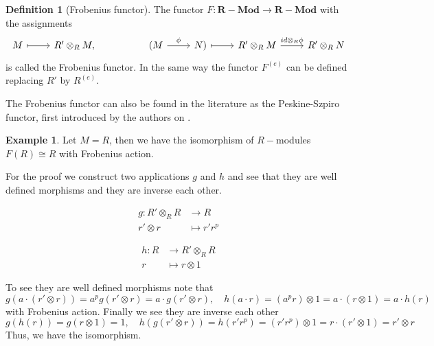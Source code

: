 \documentclass[leqno]{article}
\theoremstyle{definition}
\newtheorem{definition}{Definition}[section]
\newtheorem{example}{Example}[section]
\newcommand{\catname}[1]{{\mathbf{#1}}}
\newcommand{\Mod}{\catname{R-Mod}}
\begin{document}
\begin{definition}[Frobenius functor] The functor $F:\Mod \to \Mod$ with the assignments 
\[\begin{tikzcd}
	M & {R'\otimes_RM,} && {(M} & {N)} & {R'\otimes_R M} & {R'\otimes_RN}
	\arrow["\phi", from=1-4, to=1-5]
	\arrow["{id\otimes_R\phi}", from=1-6, to=1-7]
	\arrow[maps to, from=1-5, to=1-6]
	\arrow[maps to, from=1-1, to=1-2]
\end{tikzcd}\]
is called the Frobenius functor. In the same way the functor $F ^{(e)}$ can be defined replacing $R'$ by  $R ^{(e)}$.
\end{definition}

The Frobenius functor can also be found in the literature as the Peskine-Szpiro functor, first introduced by the authors on \cite{pesk}.

\begin{example} Let $M = R$, then we have the isomorphism of $R-$modules $F(R) \cong R$ with Frobenius action.

For the proof we construct two applications $g$ and  $h$ and see that they are well defined morphisms and they are inverse each other.

 \begin{minipage}{0.5\textwidth}
   \begin{align*}
	 g: R'\otimes _R R &\to  R \\
	 r'\otimes r &\mapsto r'r^p
   \end{align*}
\end{minipage}
\begin{minipage}{0.5\textwidth}
\begin{align*}
  h: R &\to  R'\otimes_R R\\
  r&\mapsto r\otimes 1
\end{align*}
\end{minipage}
\end{example}

To see they are well defined morphisms note that 
\[
g(a \cdot (r'\otimes r)) = a^p g(r'\otimes r) = a\cdot g(r'\otimes r), \quad h(a\cdot r)= (a^pr)\otimes 1 = a\cdot (r \otimes 1) = a \cdot h(r)
\]
with Frobenius action. Finally we see they are inverse each other
\[
g(h(r)) = g(r\otimes 1) = 1, \quad h(g(r'\otimes r)) = h(r'r^p) = (r'r^p)\otimes 1 = r\cdot (r'\otimes 1) = r'\otimes r
\] 
Thus, we have the isomorphism.
\end{document}
